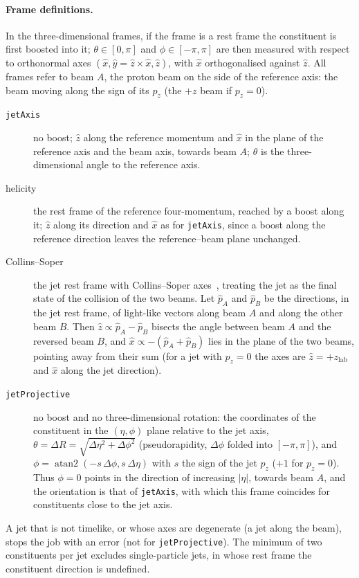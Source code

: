 \documentclass[11pt]{article}
\newcommand{\code}[1]{\texttt{#1}}
\begin{document}
\paragraph{Frame definitions.} In the three-dimensional frames, if the frame is a rest frame the constituent is first
boosted into it; $\theta \in [0,\pi]$ and $\phi \in [-\pi, \pi]$ are then measured with respect to orthonormal axes
$(\hat x, \hat y = \hat z \times \hat x, \hat z)$, with $\hat x$ orthogonalised against $\hat z$. All frames refer to
beam $A$, the proton beam on the side of the reference axis: the beam moving along the sign of its $p_z$ (the $+z$ beam
if $p_z = 0$).
\begin{description}
\item[\code{jetAxis}] no boost; $\hat z$ along the reference momentum and $\hat x$ in the plane of the reference axis
  and the beam axis, towards beam $A$; $\theta$ is the three-dimensional angle to the reference axis.
\item[helicity] the rest frame of the reference four-momentum, reached by a boost along it; $\hat z$ along its
  direction and $\hat x$ as for \code{jetAxis}, since a boost along the reference direction leaves the reference--beam
  plane unchanged.
\item[Collins--Soper] the jet rest frame with Collins--Soper axes~\cite{Collins:1977iv}, treating the jet as the final
  state of the collision of the two beams. Let $\hat p_A$ and $\hat p_B$ be the directions, in the jet rest frame, of
  light-like vectors along beam $A$ and along the other beam $B$. Then $\hat z \propto \hat p_A - \hat p_B$ bisects the
  angle between beam $A$ and the reversed beam $B$, and $\hat x \propto -(\hat p_A + \hat p_B)$ lies in the plane of
  the two beams, pointing away from their sum (for a jet with $p_z = 0$ the axes are $\hat z = +z_\mathrm{lab}$ and
  $\hat x$ along the jet direction).
\item[\code{jetProjective}] no boost and no three-dimensional rotation: the coordinates of the constituent in the
  $(\eta, \phi)$ plane relative to the jet axis, $\theta = \Delta R = \sqrt{\Delta\eta^2 + \Delta\phi^2}$
  (pseudorapidity, $\Delta\phi$ folded into $[-\pi, \pi]$), and $\phi = \operatorname{atan2}(-s\,\Delta\phi,
  s\,\Delta\eta)$ with $s$ the sign of the jet $p_z$ ($+1$ for $p_z = 0$). Thus $\phi = 0$ points in the direction of
  increasing $|\eta|$, towards beam $A$, and the orientation is that of \code{jetAxis}, with which this frame coincides
  for constituents close to the jet axis.
\end{description}
A jet that is not timelike, or whose axes are degenerate (a jet along the beam), stops the job with an error (not for
\code{jetProjective}). The minimum of two constituents per jet excludes single-particle jets, in whose rest frame the
constituent direction is undefined.
\end{document}
